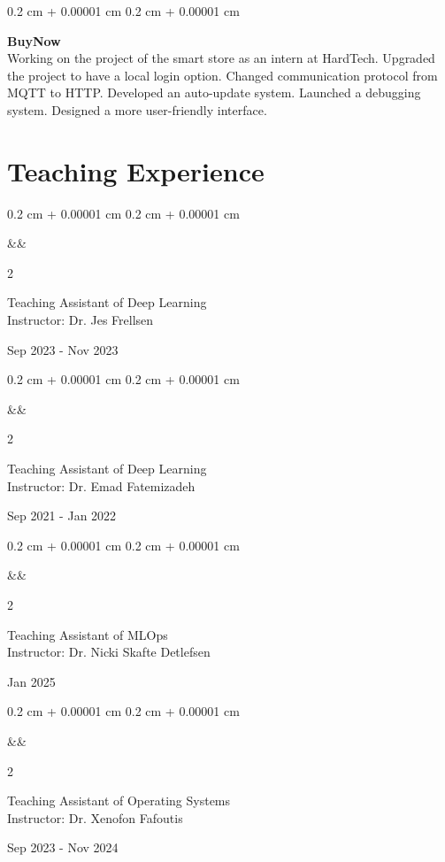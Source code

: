 \documentclass[10pt, letterpaper]{article}
\newlength{\twocolrightwidth}
\newenvironment{onecolentry}{
    \begin{adjustwidth}{
        0.2 cm + 0.00001 cm
    }{
        0.2 cm + 0.00001 cm
    }
}{
    \end{adjustwidth}
} %
\newenvironment{twocolentry}[2][]{
    \onecolentry
    \ifx&#1&%
        \setlength{\twocolrightwidth}{4.5cm}%
    \else
        \setlength{\twocolrightwidth}{#1}%
    \fi
    \def\secondColumn{#2}
    \setcolumnwidth{\fill, \twocolrightwidth}
    \begin{paracol}{2}
}{
    \switchcolumn \raggedleft \secondColumn
    \end{paracol}
    \endonecolentry
} %
\begin{document}
        \vspace{0.2 cm}

        
        \begin{onecolentry}
            \textbf{BuyNow}\\
            Working on the project of the smart store as an intern at HardTech. Upgraded the project to have a local login option. Changed communication protocol from MQTT to HTTP. Developed an auto-update system. Launched a debugging system. Designed a more user-friendly interface.
        \end{onecolentry}



    
    \section{Teaching Experience}
        
        \begin{twocolentry}{Sep 2023 - Nov 2023}
            Teaching Assistant of Deep Learning\\
            Instructor: Dr. Jes Frellsen
        \end{twocolentry}

        \vspace{0.2 cm}

        \begin{twocolentry}{Sep 2021 - Jan 2022}
            Teaching Assistant of Deep Learning\\
            Instructor: Dr. Emad Fatemizadeh
        \end{twocolentry}

        \vspace{0.2 cm}

        \begin{twocolentry}{Jan 2025}
            Teaching Assistant of MLOps\\
            Instructor: Dr. Nicki Skafte Detlefsen
        \end{twocolentry}

        \vspace{0.2 cm}

        \begin{twocolentry}{Sep 2023 - Nov 2024}
            Teaching Assistant of Operating Systems\\
            Instructor: Dr. Xenofon Fafoutis
        \end{twocolentry}

        \vspace{0.2 cm}
\end{document}
